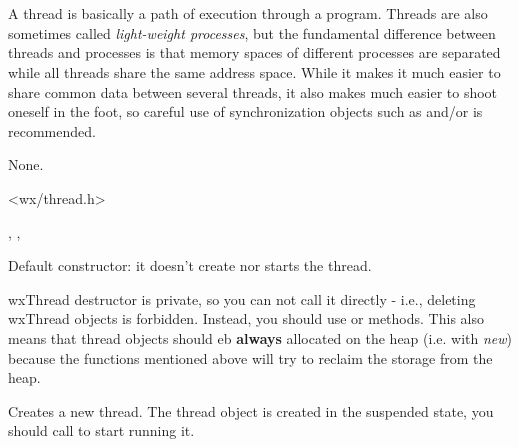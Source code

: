 \section{}\label{wxthread}

A thread is basically a path of execution through a program. Threads are also
sometimes called {\it light-weight processes}, but the fundamental difference
between threads and processes is that memory spaces of different processes are
separated while all threads share the same address space. While it makes it
much easier to share common data between several threads, it also makes much
easier to shoot oneself in the foot, so careful use of synchronization objects
such as  and/or  is recommended.


None.


<wx/thread.h>


, , 


\label{wxthreadctor}


Default constructor: it doesn't create nor starts the thread.



wxThread destructor is private, so you can not call it directly - i.e., deleting
wxThread objects is forbidden. Instead, you should use  or
 methods. This also means that thread objects should
eb {\bf always} allocated on the heap (i.e. with {\it new}) because the functions
mentioned above will try to reclaim the storage from the heap.

\label{wxthreadcreate}


Creates a new thread. The thread object is created in the suspended state, you
should call  to start running it.

